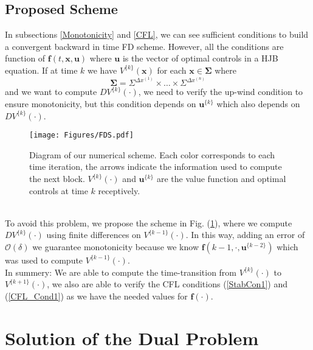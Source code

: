  \subsection{Proposed Scheme} \label{Proposed_Scheme}

In subsections \ref{Monotonicity} and \ref{CFL}, we can see sufficient conditions to build a convergent backward in time FD scheme. However, all the conditions are function of $\bm{f}(t,\bm{x},\bm{u})$ where $\bm{u}$ is the vector of optimal controls in a HJB equation. If at time $k$ we have $V^{\{k\}}(\bm{x})$ for each $\bm{x}\in\bm{\Sigma}$ where
\begin{equation}
\bm{\Sigma}=\Sigma^{\Delta x^{(1)}}\times\dots\times\Sigma^{\Delta x^{(n)}}
\label{Spatial_Disc}
\end{equation}
and we want to compute $DV^{\{k\}}(\cdot)$, we need to verify the up-wind condition to ensure monotonicity, but this condition depends on $\bm{u}^{\{k\}}$ which also depends on $DV^{\{k\}}(\cdot)$.
\begin{figure}[ht!]
\centering
\texttt{[image: Figures/FDS.pdf]}
\caption{Diagram of our numerical scheme. Each color corresponds to each time iteration, the arrows indicate the information used to compute the next block. $V^{\{k\}}(\cdot)$ and $\bm{u}^{\{k\}}$ are the value function and optimal controls at time $k$ receptively. }
\label{FDS}
\end{figure}\\
To avoid this problem, we propose the scheme in Fig. (\ref{FDS}), where we compute $DV^{\{k\}}(\cdot)$ using finite differences on $V^{\{k-1\}}(\cdot)$. In this way, adding an error of $\mathcal{O}(\delta)$ we guarantee monotonicity because we know $\bm{f}(k-1,\cdot,\bm{u}^{\{k-2\}})$ which was used to compute $V^{\{k-1\}}(\cdot)$.\\
In summery: We are able to compute the time-transition from $V^{\{k\}}(\cdot)$ to $V^{\{k+1\}}(\cdot)$, we also are able to verify the CFL conditions (\ref{StabCon1}) and (\ref{CFL_Cond1}) as we have the needed values for $\bm{f}(\cdot)$.

\section{Solution of the Dual Problem} \label{NM_DP}

